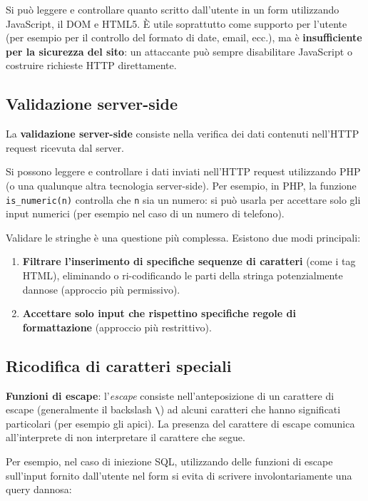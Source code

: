 Si può leggere e controllare quanto scritto dall'utente in un form utilizzando JavaScript, il DOM e HTML5. È utile soprattutto come supporto per l'utente (per esempio per il controllo del formato di date, email, ecc.), ma è \textbf{insufficiente per la sicurezza del sito}: un attaccante può sempre disabilitare JavaScript o costruire richieste HTTP direttamente.

\subsection{Validazione server-side}

La \textbf{validazione server-side} consiste nella verifica dei dati contenuti nell'HTTP request ricevuta dal server.

Si possono leggere e controllare i dati inviati nell'HTTP request utilizzando PHP (o una qualunque altra tecnologia server-side). Per esempio, in PHP, la funzione \texttt{is\_numeric(n)} controlla che \texttt{n} sia un numero: si può usarla per accettare solo gli input numerici (per esempio nel caso di un numero di telefono).

Validare le stringhe è una questione più complessa. Esistono due modi principali:

\begin{enumerate}
    \item \textbf{Filtrare l'inserimento di specifiche sequenze di caratteri} (come i tag HTML), eliminando o ri-codificando le parti della stringa potenzialmente dannose (approccio più permissivo).
    \item \textbf{Accettare solo input che rispettino specifiche regole di formattazione} (approccio più restrittivo).
\end{enumerate}

\subsection{Ricodifica di caratteri speciali}

\textbf{Funzioni di escape}: l'\emph{escape} consiste nell'anteposizione di un carattere di escape (generalmente il backslash \texttt{\textbackslash}) ad alcuni caratteri che hanno significati particolari (per esempio gli apici). La presenza del carattere di escape comunica all'interprete di non interpretare il carattere che segue.

Per esempio, nel caso di iniezione SQL, utilizzando delle funzioni di escape sull'input fornito dall'utente nel form si evita di scrivere involontariamente una query dannosa:


